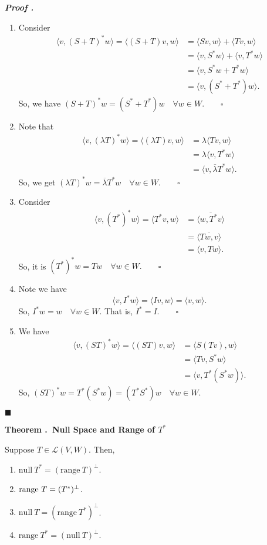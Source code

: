 \documentclass[11pt, letterpaper]{article}
\newcounter{index}[subsection]
\newenvironment*{thm}[1]{\begin{tcolorbox}\par\noindent\textbf{Theorem \thesubsection.\stepcounter{index}\theindex\ #1} \par}{\par\end{tcolorbox}}
\newcounter{nprf}[subsection]
\newenvironment*{prf}{\par\indent\textbf{\textit{Proof \stepcounter{nprf}\thenprf.}}}{\hfill$\blacksquare$\par}
\def\L{\mathcal{L}}
\def\pqde{\qquad\square}
\def\Null{\mathrm{null\ }}
\def\range{\mathrm{range\ }}
\begin{document}
\begin{prf}
	\begin{enumerate}
		\item Consider \[\begin{aligned}\langle v,(S+T)^*w\rangle=\langle(S+T)v,w\rangle&=\langle Sv,w\rangle+\langle Tv,w\rangle\\&=\langle v,S^*w\rangle+\langle v,T^*w\rangle\\&=\langle v,S^*w+T^*w\rangle\\&=\langle v,(S^*+T^*)w\rangle.\end{aligned}\] So, we have $(S+T)^*w=(S^*+T^*)w\quad\forall w\in W.\pqde$
		\item Note that \[\begin{aligned}\langle v,(\lambda T)^*w\rangle=\langle(\lambda T)v,w\rangle&=\lambda\langle Tv,w\rangle\\&=\lambda\langle v,T^*w\rangle\\&=\langle v,\overline{\lambda}T^*w\rangle.\end{aligned}\] So, we get $(\lambda T)^*w=\overline{\lambda}T^*w\quad\forall w\in W.\pqde$
		\item Consider \[\begin{aligned}\langle v,(T^*)^*w\rangle=\langle T^*v,w\rangle&=\overline{\langle w,T^*v\rangle}\\&=\overline{\langle Tw,v\rangle}\\&=\langle v,Tw\rangle.\end{aligned}\] So, it is $(T^*)^*w=Tw\quad\forall w\in W.\pqde$
		\item Note we have \[\langle v,I^*w\rangle=\langle Iv,w\rangle=\langle v,w\rangle.\] So, $I^*w=w\quad\forall w\in W$. That is, $I^*=I.\pqde$
		\item We have \[\begin{aligned}\langle v,(ST)^*w\rangle=\langle(ST)v,w\rangle&=\langle S(Tv),w\rangle\\&=\langle Tv,S^*w\rangle\\&=\langle v,T^*(S^*w)\rangle.\end{aligned}\]So, $(ST)^*w=T^*(S^*w)=(T^*S^*)w\quad\forall w\in W.$
	\end{enumerate}	
\end{prf}
\begin{thm}{Null Space and Range of $T^*$}
	Suppose $T\in\L(V,W)$. Then, 
	\begin{enumerate}
		\item $\Null T^*=(\range T)^\perp$.
		\item $\range T=(\null T^*)^\perp$.
		\item $\Null T=(\range T^*)^\perp$.
		\item $\range T^*=(\Null T)^\perp$.
	\end{enumerate}
\end{thm}
\end{document}
